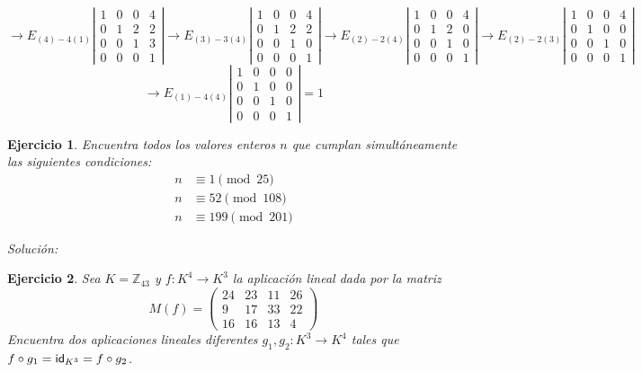\documentclass{amsart}
\newtheorem{ejer}{Ejercicio}
\begin{document}
$$
\to E_{(4) - 4(1)}
\left|\begin{array}{rrrr}
	1 & 0 & 0 & 4 \\
	0 & 1 & 2 & 2 \\
	0 & 0 & 1 & 3 \\
	0 & 0 & 0 & 1
\end{array}\right| 
\to E_{(3) - 3(4)}
\left|\begin{array}{rrrr}
	1 & 0 & 0 & 4 \\
	0 & 1 & 2 & 2 \\
	0 & 0 & 1 & 0 \\
	0 & 0 & 0 & 1
\end{array}\right| 
\to E_{(2) - 2(4)}
\left|\begin{array}{rrrr}
	1 & 0 & 0 & 4 \\
	0 & 1 & 2 & 0 \\
	0 & 0 & 1 & 0 \\
	0 & 0 & 0 & 1
\end{array}\right| 
\to E_{(2) - 2(3)}
\left|\begin{array}{rrrr}
	1 & 0 & 0 & 4 \\
	0 & 1 & 0 & 0 \\
	0 & 0 & 1 & 0 \\
	0 & 0 & 0 & 1
\end{array}\right| 
$$
$$
\to E_{(1) - 4(4)}
\left|\begin{array}{rrrr}
	1 & 0 & 0 & 0 \\
	0 & 1 & 0 & 0 \\
	0 & 0 & 1 & 0 \\
	0 & 0 & 0 & 1
\end{array}\right| 
= 1
$$

\vspace{10cm}

\begin{ejer}
Encuentra todos los valores enteros $n$ que cumplan 
simultáneamente las siguientes condiciones:
\begin{align*}
n & \equiv 1 \pmod{25} \\
n & \equiv 52 \pmod{108} \\
n & \equiv 199 \pmod{201} 
\end{align*}
\end{ejer}

{\it Solución: }



\begin{ejer}
Sea $K = {\mathbb Z}_{43}$ y $f:K^4 \to K^3$ la aplicación lineal
dada por la matriz $$M(f) = \left(\begin{array}{rrrr}
24 & 23 & 11 & 26 \\
9 & 17 & 33 & 22 \\
16 & 16 & 13 & 4
\end{array}\right)$$
Encuentra dos aplicaciones lineales diferentes $g_1,g_2:K^3 \to K^4$ 
tales que $f\circ g_1 = {\sf id}_{K^3} = f\circ g_2$.
\end{ejer}
\end{document}
